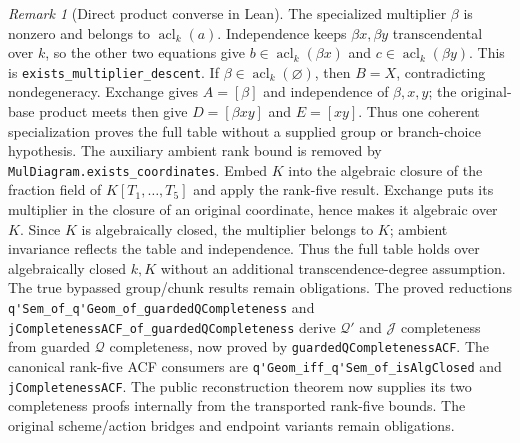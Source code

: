 \documentclass[11pt,oneside]{article}
\theoremstyle{definition}
\theoremstyle{remark}
\newtheorem{remark}[theorem]{Remark}
\newcommand{\acl}{\operatorname{acl}}
\newcommand{\Qrel}{\mathcal{Q}}
\newcommand{\Qprel}{\mathcal{Q}'}
\newcommand{\Jrel}{\mathcal{J}}
\newcommand{\lean}[1]{\nolinkurl{#1}}
\begin{document}
\begin{remark}[Direct product converse in Lean]
The specialized multiplier $\beta$ is nonzero and belongs to $\acl_k(a)$.
Independence keeps $\beta x,\beta y$ transcendental over $k$, so the other
two equations give $b\in\acl_k(\beta x)$ and $c\in\acl_k(\beta y)$.
This is \lean{exists_multiplier_descent}.  If $\beta\in\acl_k(\varnothing)$,
then $B=X$, contradicting nondegeneracy.  Exchange gives $A=[\beta]$ and
independence of $\beta,x,y$; the original-base product meets then give
$D=[\beta xy]$ and $E=[xy]$.  Thus one coherent specialization proves the
full table without a supplied group or branch-choice hypothesis.
The auxiliary ambient rank bound is removed by
\lean{MulDiagram.exists_coordinates}.  Embed $K$ into the algebraic closure
of the fraction field of $K[T_1,\ldots,T_5]$ and apply the rank-five result.
Exchange puts its multiplier in the closure of an original coordinate, hence
makes it algebraic over $K$.  Since $K$ is algebraically closed, the multiplier
belongs to $K$; ambient invariance reflects the table and independence.
Thus the full table holds over algebraically closed $k,K$ without an additional
transcendence-degree assumption.
The true bypassed group/chunk results remain obligations.
The proved reductions
\lean{q'Sem_of_q'Geom_of_guardedQCompleteness} and
\lean{jCompletenessACF_of_guardedQCompleteness}
derive $\Qprel$ and $\Jrel$ completeness from guarded $\Qrel$ completeness, now proved by
\lean{guardedQCompletenessACF}.  The canonical rank-five ACF consumers are
\lean{q'Geom_iff_q'Sem_of_isAlgClosed} and \lean{jCompletenessACF}.  The public reconstruction
theorem now supplies its two completeness proofs internally from the transported rank-five
bounds.  The original scheme/action bridges and endpoint variants remain obligations.
\end{remark}
\end{document}
